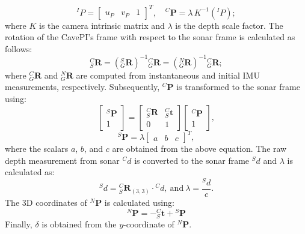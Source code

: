 \[
  {}^I{P} = 
  \begin{bmatrix}
      u_{P} & v_{P} & 1
  \end{bmatrix}^T, 
  \quad
  {}^C\boldsymbol{P} = \lambda \, K^{-1} ({}^IP);
\] where $K$ is the camera intrinsic matrix and  $\lambda$ is the depth scale factor.
The rotation of the CavePI's frame with respect to the sonar frame is calculated as follows:
\[
      {}^{C}_{S}\boldsymbol{R} 
      = \left({}^{S}_{G}\boldsymbol{R}\right)^{-1} {}^{C}_{G}\boldsymbol{R} 
      = \left({}^{N}_{G}\boldsymbol{R}\right)^{-1} {}^{C}_{G}\boldsymbol{R};
    \]
where ${}^{C}_{G}\boldsymbol{R}$ and ${}^{N}_{G}\boldsymbol{R}$ are computed from instantaneous and initial IMU measurements, respectively. %
Subsequently, ${}^C\boldsymbol{P}$ is transformed to the sonar frame using:   
\[
      \begin{bmatrix}
          {}^S\boldsymbol{P} \\
          1
      \end{bmatrix}
      =
      \begin{bmatrix}
          {}^{C}_{S}\boldsymbol{R} & {}^{C}_{S}\boldsymbol{t} \\
          0 & 1
      \end{bmatrix}
      \begin{bmatrix}
          {}^C\boldsymbol{P} \\
          1
      \end{bmatrix},
    \]
    \[
      {}^S\boldsymbol{P} 
      = \lambda
      \begin{bmatrix}
          a & b & c
      \end{bmatrix}^T,
    \]
where the scalars \(a\), \(b\), and \(c\) are obtained from the above equation. The raw depth measurement from sonar ${}^Cd$ is converted to the sonar frame ${}^Sd$ and $\lambda$ is calculated as:
    \[
        {{}^{S}d} = {}^{C}_{S}\boldsymbol{R}_{(3,3)} \cdot {}^{C}d, ~ \text{and}~\lambda = \frac{{}^Sd}{c}.
    \]
The 3D coordinates of ${}^N\boldsymbol{P}$ is calculated using:
    \[
      {}^N\boldsymbol{P} = -{}^{C}_{S}\boldsymbol{t} + {}^S\boldsymbol{P}
    \]
Finally, $\delta$ is obtained from the \(y\)-coordinate of \({}^N\boldsymbol{P}\).





